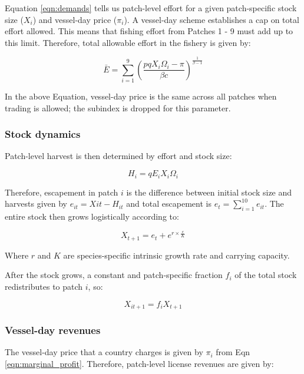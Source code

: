 \documentclass[12pt]{article}
\begin{document}
Equation \ref{eqn:demands} tells us patch-level effort for a given patch-specific stock size ($X_i$) and vessel-day price ($\pi_i$). A vessel-day scheme establishes a cap on total effort allowed. This means that fishing effort from Patches 1 - 9 must add up to this limit. Therefore, total allowable effort in the fishery is given by:

\begin{equation}
\bar{E} = \sum_{i = 1}^9\left(\frac{pqX_i\Omega_i - \pi}{\beta c }\right) ^ {\frac{1}{\beta - 1}}
\label{eqn:Ebar}
\end{equation}

In the above Equation, vessel-day price is the same across all patches when trading is allowed; the subindex is dropped for this parameter.

\subsubsection{Stock dynamics}

Patch-level harvest is then determined by effort and stock size:

\begin{equation}
H_i = qE_iX_i\Omega_i
\label{eqn:harvest}
\end{equation}


Therefore, escapement in patch $i$ is the difference between initial stock size and harvests given by $e_{it} = X{it} - H_{it}$ and total escapement is $e_t=\sum_{i=1}^{10}e_{it}$. The entire stock then grows logistically according to:

\begin{equation}
X_{t+1} = e_t + e^{r \times \frac{e}{K}}
\label{eqn:grow}
\end{equation}

Where $r$ and $K$ are species-specific intrinsic growth rate and carrying capacity.

After the stock grows, a constant and patch-specific fraction $f_i$ of the total stock redistributes to patch $i$, so:

\begin{equation}
X_{it+1} = f_iX_{t+1}
\label{eqn:disperse}
\end{equation}

\subsubsection{Vessel-day revenues}

The vessel-day price that a country charges is given by $\pi_i$ from Eqn \ref{eqn:marginal_profit}. Therefore, patch-level license revenues are given by:
\end{document}
